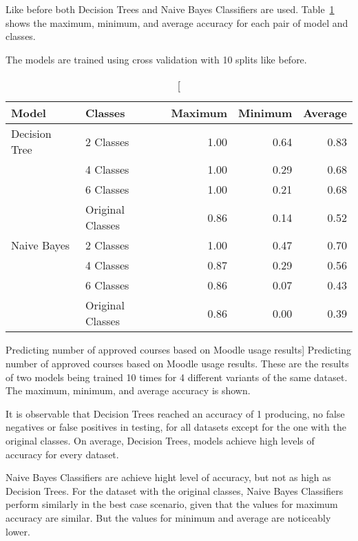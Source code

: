 Like before both Decision Trees and Naive Bayes Classifiers are used.
Table~\ref{tab:exp_003_res} shows the maximum, minimum, and average accuracy
for each pair of model and classes.

The models are trained using cross validation with 10 splits like before.

\begin{table}[h!]
    \centering

    \begin{tabular}{| l | l | r | r | r |}
        \hline
        \textbf{Model} & \textbf{Classes} & \textbf{Maximum} & \textbf{Minimum} & \textbf{Average} \\ \hline
        Decision Tree & 2 Classes        & 1.00 & 0.64 & 0.83 \\
                      & 4 Classes        & 1.00 & 0.29 & 0.68 \\
                      & 6 Classes        & 1.00 & 0.21 & 0.68 \\
                      & Original Classes & 0.86 & 0.14 & 0.52 \\ \hline
        Naive Bayes   & 2 Classes        & 1.00 & 0.47 & 0.70 \\
                      & 4 Classes        & 0.87 & 0.29 & 0.56 \\
                      & 6 Classes        & 0.86 & 0.07 & 0.43 \\
                      & Original Classes & 0.86 & 0.00 & 0.39 \\ \hline
    \end{tabular}

    \caption
        [Predicting number of approved courses based on Moodle usage results]
        {Predicting number of approved courses based on Moodle usage results.
        These are the results of two models being trained 10 times for 4
        different variants of the same dataset. The maximum, minimum, and
        average accuracy is shown.}

    \label{tab:exp_003_res}
\end{table}

It is observable that Decision Trees reached an accuracy of 1 producing, no
false negatives or false positives in testing, for all datasets except for the
one with the original classes. On average, Decision Trees, models achieve high
levels of accuracy for every dataset.

Naive Bayes Classifiers are achieve hight level of accuracy, but not as high as
Decision Trees. For the dataset with the original classes, Naive Bayes
Classifiers perform similarly in the best case scenario, given that the values
for maximum accuracy are similar. But the values for minimum and average are
noticeably lower.

